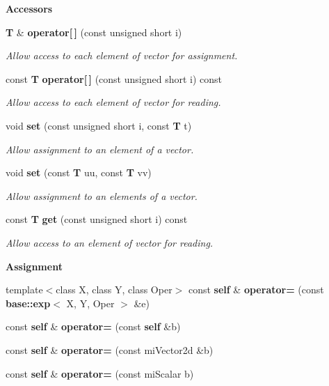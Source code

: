 \begin{Indent}{\bf Accessors}\par
\begin{CompactItemize}
\item 
{\bf T} \& {\bf operator[$\,$]} (const unsigned short i)
\begin{CompactList}\small\item\em Allow access to each element of vector for assignment. \item\end{CompactList}\item 
const {\bf T} {\bf operator[$\,$]} (const unsigned short i) const 
\begin{CompactList}\small\item\em Allow access to each element of vector for reading. \item\end{CompactList}\item 
void {\bf set} (const unsigned short i, const {\bf T} t)
\begin{CompactList}\small\item\em Allow assignment to an element of a vector. \item\end{CompactList}\item 
void {\bf set} (const {\bf T} uu, const {\bf T} vv)
\begin{CompactList}\small\item\em Allow assignment to an elements of a vector. \item\end{CompactList}\item 
const {\bf T} {\bf get} (const unsigned short i) const 
\begin{CompactList}\small\item\em Allow access to an element of vector for reading. \item\end{CompactList}\end{CompactItemize}
\end{Indent}
\begin{Indent}{\bf Assignment}\par
\begin{CompactItemize}
\item 
template$<$class X, class Y, class Oper$>$ const {\bf self} \& {\bf operator=} (const {\bf base::exp}$<$ X, Y, Oper $>$ \&e)
\item 
const {\bf self} \& {\bf operator=} (const {\bf self} \&b)
\item 
const {\bf self} \& {\bf operator=} (const mi\-Vector2d \&b)
\item 
const {\bf self} \& {\bf operator=} (const mi\-Scalar b)
\end{CompactItemize}
\end{Indent}
